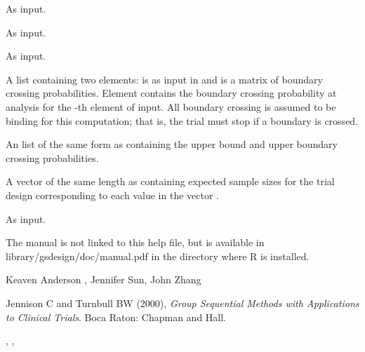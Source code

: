 \begin{Value}
\begin{ldescription}
\item[\code{k}] As input.
\item[\code{theta}] As input.
\item[\code{n.I}] As input.
\item[\code{lower}] A list containing two elements:  is as input in  and  is a matrix of boundary 
crossing probabilities. Element  contains the boundary crossing probability at analysis  for the -th
element of  input. All boundary crossing is assumed to be binding for this computation; 
that is, the trial must stop if a boundary is crossed.
\item[\code{upper}] An list of the same form as  containing the upper bound and upper boundary crossing probabilities.
\item[\code{en}] A vector of the same length as  containing expected sample sizes for the trial design
corresponding to each value in the vector .
\item[\code{r}] As input.
\end{ldescription}
\end{Value}
\begin{Note}\relax
The manual is not linked to this help file, but is available in library/gsdesign/doc/manual.pdf
in the directory where R is installed.
\end{Note}
\begin{Author}\relax
Keaven Anderson , Jennifer Sun, John Zhang
\end{Author}
\begin{References}\relax
Jennison C and Turnbull BW (2000), \emph{Group Sequential Methods with Applications to Clinical Trials}.
Boca Raton: Chapman and Hall.
\end{References}
\begin{SeeAlso}\relax
{}, , 
\end{SeeAlso}

